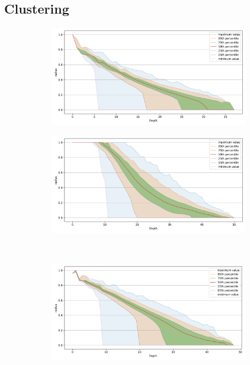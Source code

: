 \documentclass[review,supplement,onefignum,onetabnum]{siamonline220329}
\begin{document}
\subsection{Clustering}

\begin{figure}[ht!]
    \begin{subfigure}[b]{0.47\textwidth}
    \includegraphics[width=0.95\textwidth]{images/radius/fashion-mnist-60000.png}\\
    \label{fig:results:fashion-mnist-radius}
    \end{subfigure}%
    \begin{subfigure}[b]{0.47\textwidth}
    \includegraphics[width=0.95\textwidth]{images/radius/glove-25-1183514.png}\\
    \label{fig:results:glove-25-radius}
    \end{subfigure}
    \vspace{1em}
    \\
    \begin{subfigure}[b]{0.47\textwidth}
    \includegraphics[width=0.95\textwidth]{images/radius/sift-1000000.png}\\

\end{subfigure}
\end{figure}
\end{document}
